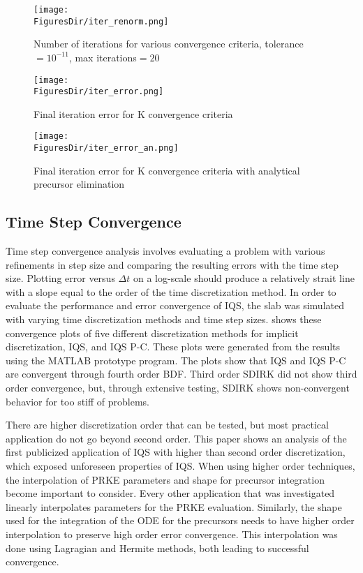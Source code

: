 \begin{figure}[!htbp]
\centering
\texttt{[image: \\FiguresDir/iter\_renorm.png]}
\caption{Number of iterations for various convergence criteria, tolerance$=10^{-11}$, max iterations$=20$}
\label{fig:iter}
\end{figure}

\begin{figure}[!htbp]
\centering
\texttt{[image: \\FiguresDir/iter\_error.png]}
\caption{Final iteration error for K convergence criteria}
\label{fig:iter_err}
\end{figure}

\begin{figure}[!htbp]
\centering
\texttt{[image: \\FiguresDir/iter\_error\_an.png]}
\caption{Final iteration error for K convergence criteria with analytical precursor elimination}
\label{fig:iter_err_an}
\end{figure}


\subsection{Time Step Convergence}

Time step convergence analysis involves evaluating a problem with various refinements in step size and comparing the resulting errors with the time step size. Plotting error versus $\Delta t$ on a log-scale should produce a relatively strait line with a slope equal to the order of the time discretization method. In order to evaluate the performance and error convergence of IQS, the slab was simulated with varying time discretization methods and time step sizes.   shows these convergence plots of five different discretization methods for implicit discretization, IQS, and IQS P-C.  These plots were generated from the results using the MATLAB prototype program.  The plots show that IQS and IQS P-C are convergent through fourth order BDF.  Third order SDIRK did not show third order convergence, but, through extensive testing, SDIRK shows non-convergent behavior for too stiff of problems.  

There are higher discretization order that can be tested, but most practical application do not go beyond second order.  This paper shows an analysis of the first publicized application of IQS with higher than second order discretization, which exposed unforeseen properties of IQS.  When using higher order techniques, the interpolation of PRKE parameters and shape for precursor integration become important to consider.  Every other application that was investigated linearly interpolates parameters for the PRKE evaluation.  Similarly, the shape used for the integration of the ODE for the precursors needs to have higher order interpolation to preserve high order error convergence.  This interpolation was done using Lagragian and Hermite methods, both leading to successful convergence.

